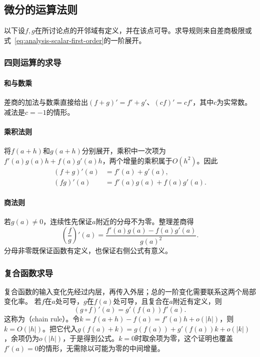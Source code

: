 \subsection{微分的运算法则}
\label{sec:analysis-scalar-chain-rules}

以下设$f,g$在所讨论点的开邻域有定义，并在该点可导。求导规则来自差商极限或式~\eqref{eq:analysis-scalar-first-order}的一阶展开。

\subsubsection{四则运算的求导}

\paragraph{和与数乘}
差商的加法与数乘直接给出$(f+g)'=f'+g'$、$(cf)'=cf'$，其中$c$为实常数。减法是$c=-1$的情形。

\paragraph{乘积法则}
将$f(a+h)$和$g(a+h)$分别展开，乘积中一次项为$f'(a)g(a)h+f(a)g'(a)h$，两个增量的乘积属于$O(h^2)$。因此
\begin{equation}
 \begin{aligned}
 (f+g)'(a)&=f'(a)+g'(a),\\
 (fg)'(a)&=f'(a)g(a)+f(a)g'(a).
 \end{aligned}
\label{eq:analysis-scalar-sum-product-rules}
\end{equation}

\paragraph{商法则}
若$g(a)\neq0$，连续性先保证$a$附近的分母不为零。整理差商得
\[
 \left(\frac fg\right)'(a)
 =\frac{f'(a)g(a)-f(a)g'(a)}{g(a)^2}.
\]
分母非零既保证函数有定义，也保证右侧公式有意义。

\subsubsection{复合函数求导}

复合函数的输入变化先经过内层，再传入外层；总的一阶变化需要联系这两个局部变化率。
若$f$在$a$处可导，$g$在$f(a)$处可导，且复合在$a$附近有定义，则
\begin{equation}
 (g\circ f)'(a)=g'(f(a))f'(a).
\label{eq:analysis-scalar-chain-rule}
\end{equation}
这称为（chain rule）。令$k=f(a+h)-f(a)=f'(a)h+o(|h|)$，则$k=O(|h|)$。把它代入$g(f(a)+k)=g(f(a))+g'(f(a))k+o(|k|)$，余项仍为$o(|h|)$，于是得到公式。$k=0$时取余项为零，这个证明也覆盖$f'(a)=0$的情形，无需除以可能为零的中间增量。

